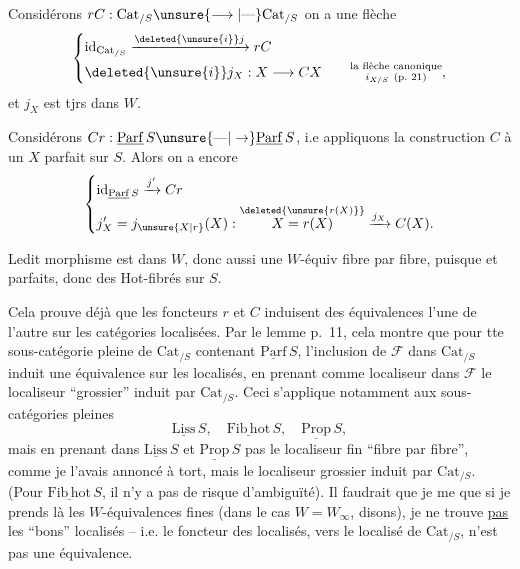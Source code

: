 Considérons $rC:\mathrm{Cat}_{/S}\unsure{\longrightarrow|\text{---}}\mathrm{Cat}_{/S}$ on a une flèche
\[
\left\{\begin{aligned}
&\mathrm{id}_{\mathrm{Cat}_{/S}}\xrightarrow{\deleted{\unsure{i}}j}rC\\
&\deleted{\unsure{i}}j_X:X\longrightarrow CX\qquad \substack{\text{la flèche canonique}\\ i_{X/S}\ (\text{p.~21})},
\end{aligned}\right.
\]
et $j_X$ est tjrs dans $W$.

Considérons $Cr:\underline{\mathrm{Parf}}\,S\unsure{\text{---}|\to}\underline{\mathrm{Parf}}\,S$, i.e appliquons la construction $C$ à un $X$ parfait sur $S$. Alors on a encore
\[
\left\{\begin{aligned}
&\mathrm{id}_{\underline{\mathrm{Parf}}\,S}\xrightarrow{j'}Cr\\
&j'_X=j_{\unsure{X|r}}(X):\overset{\deleted{\unsure{r(X)}}}{X=r(X)}\xrightarrow{j_X}C(X).
\end{aligned}\right.
\]

Ledit morphisme est dans $W$, donc aussi une $W$-équiv fibre par fibre, puisque  et   parfaits, donc des Hot-fibrés sur $S$.


Cela prouve déjà que les foncteurs $r$ et $C$ induisent des équivalences  l'une de l'autre sur les catégories localisées. Par le lemme p.~11, cela montre que pour tte sous-catégorie pleine  de $\mathrm{Cat}_{/S}$ contenant $\underline{\mathrm{Parf}}\,S$, l'inclusion de $\mathcal F$ dans $\mathrm{Cat}_{/S}$ induit une équivalence sur les localisés, en prenant comme localiseur dans $\mathcal F$ le localiseur ``grossier'' induit par $\mathrm{Cat}_{/S}$. Ceci s'applique notamment aux sous-catégories pleines
\[
\underline{\mathrm{Liss}}\,S,\quad\underline{\mathrm{Fib\,hot}}\,S,\quad\underline{\mathrm{Prop}}\,S,
\]
\leavevmode\llap{\smash{\rule[-2.3\baselineskip]{.4pt}{3\baselineskip}}\quad}mais en prenant dans $\underline{\mathrm{Liss}}\,S$ et $\underline{\mathrm{Prop}}\,S$  pas le localiseur fin ``fibre par fibre'', comme je l'avais annoncé à tort, mais le localiseur grossier induit par $\mathrm{Cat}_{/S}$. (Pour $\underline{\mathrm{Fib\,hot}}\,S$, il n'y a pas de risque d'ambiguïté). Il faudrait que je me  que si je prends là les $W$-équivalences fines (dans le cas $W=W_{\infty}$, disons), je ne trouve \uline{pas} les ``bons'' localisés -- i.e. le foncteur des localisés, vers le localisé de $\mathrm{Cat}_{/S}$, n'est pas une équivalence.

